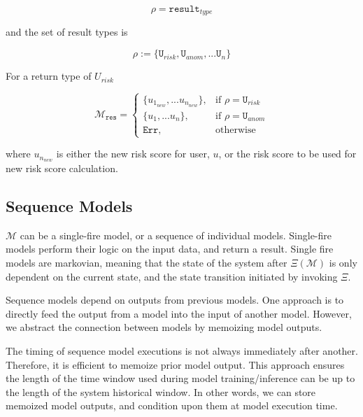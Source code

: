 \documentclass[10pt, titlepage, twocolumn]{report}
\begin{document}
\begin{equation}
\rho = \texttt{result}_{type} 
\end{equation}

and the set of result types is

\begin{equation}
\rho := \{ \texttt{U}_{risk}, \texttt{U}_{anom}, ... \texttt{U}_{n} \} 
\end{equation}

For a return type of \(U_{risk}\)

\begin{equation}
\boldsymbol{\mathcal{M}}_{\texttt{res}} =
\begin{cases}

    \{u_{1_{new}}, ... u_{n_{new}} \},		   
    & \text{if } \rho = \texttt{U}_{risk}\\
    
    \{u_1, ... u_n \},		   
    & \text{if } \rho = \texttt{U}_{anom}\\
    
    \texttt{Err},              							   
    & \text{otherwise}
    
\end{cases}
\end{equation}

where \(u_{n_{new}}\) is either the new risk score for user, \(u\), or the risk score to be used for new risk score calculation. 



\subsection{Sequence Models}
\(\boldsymbol{\mathcal{M}}\) can be a single-fire model, or a sequence of individual models. Single-fire models perform their logic on the input data, and return a result. Single fire models are markovian, meaning that the state of the system after \( \Xi ( \boldsymbol{\mathcal{M}} ) \) is only dependent on the current state, and the state transition initiated by invoking \(\Xi\).

Sequence models depend on outputs from previous models. One approach is to directly feed the output from a model into the input of another model. However, we abstract the connection between models by memoizing model outputs. 


The timing of sequence model executions is not always immediately after another. Therefore, it is efficient to memoize prior model output. This approach ensures the length of the time window used during model training/inference can be up to the length of the system historical window. In other words, we can store memoized model outputs, and condition upon them at model execution time.   
\end{document}
